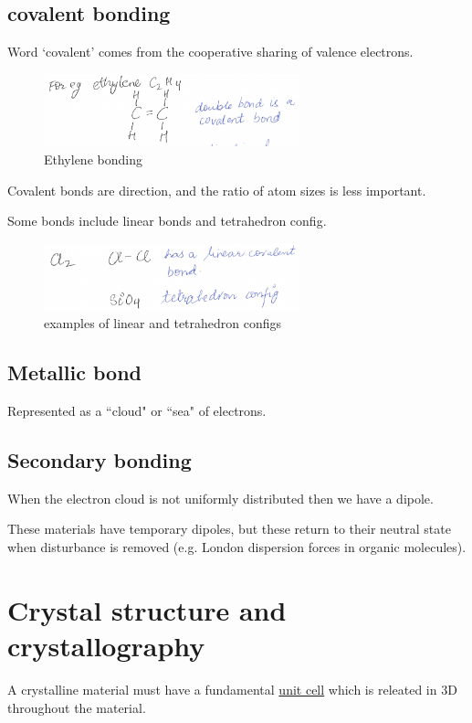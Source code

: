 \documentclass{article}
\begin{document}
\subsection{covalent bonding}
Word `covalent' comes from the cooperative sharing of valence electrons.
\begin{figure}[h!]
	\centering
	\includegraphics[width=0.66\textwidth]{assets/3173d297.png}
	\caption{Ethylene bonding}
\end{figure}

Covalent bonds are direction, and the ratio of atom sizes is less important.

Some bonds include linear bonds and tetrahedron config.

\begin{figure}[h!]
	\centering
	\includegraphics[width=0.66\textwidth]{assets/b1a91157.png}
	\caption{examples of linear and tetrahedron configs}
\end{figure}

\subsection{Metallic bond}
Represented as a ``cloud" or ``sea" of electrons.

\subsection{Secondary bonding}
When the electron cloud is not uniformly distributed then we have a dipole.

These materials have temporary dipoles, but these return to their neutral state when disturbance is removed (e.g. London dispersion forces in organic molecules).

\section{Crystal structure and crystallography}
A crystalline material must have a fundamental \underline{unit cell} which is releated in 3D throughout the material.
\end{document}
